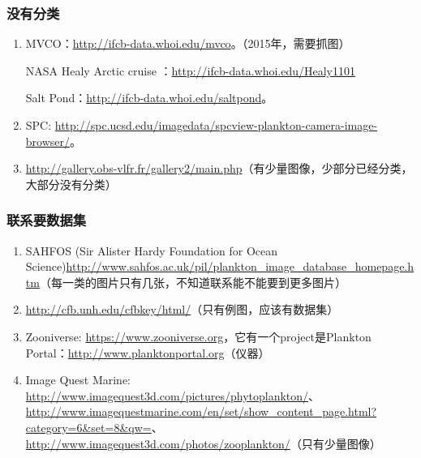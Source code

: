 \subsubsection{没有分类}
\begin{enumerate}
\item MVCO：\url{http://ifcb-data.whoi.edu/mvco}。（2015年，需要抓图）

NASA Healy Arctic cruise ：\url{http://ifcb-data.whoi.edu/Healy1101}

Salt Pond：\url{http://ifcb-data.whoi.edu/saltpond}。

\item SPC: \url{http://spc.ucsd.edu/imagedata/spcview-plankton-camera-image-browser/}。

\item \url{http://gallery.obs-vlfr.fr/gallery2/main.php}（有少量图像，少部分已经分类，大部分没有分类）
\end{enumerate}

\subsubsection{联系要数据集}
\begin{enumerate}
\item SAHFOS (Sir Alister Hardy Foundation for Ocean Science)\url{http://www.sahfos.ac.uk/pil/plankton_image_database_homepage.htm}（每一类的图片只有几张，不知道联系能不能要到更多图片）

\item \url{http://cfb.unh.edu/cfbkey/html/}（只有例图，应该有数据集）

\item Zooniverse: \url{https://www.zooniverse.org}，它有一个project是Plankton Portal：\url{http://www.planktonportal.org}（仪器）

\item Image Quest Marine: \url{http://www.imagequest3d.com/pictures/phytoplankton/}、\url{http://www.imagequestmarine.com/en/set/show_content_page.html?category=6&set=8&qw=}、\url{http://www.imagequest3d.com/photos/zooplankton/}（只有少量图像）

\end{enumerate}


